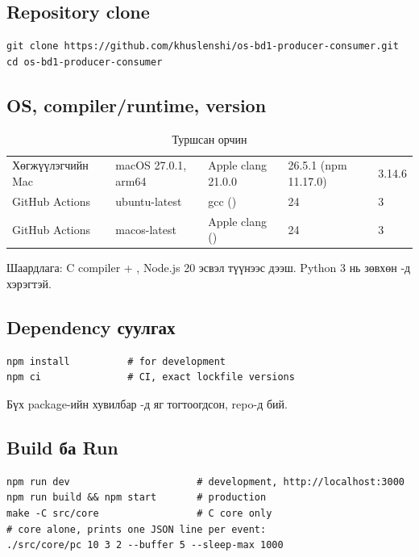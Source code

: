 \documentclass[12pt,a4paper]{article}
\begin{document}
\subsection{Repository clone}
\begin{lstlisting}[style=shell]
git clone https://github.com/khuslenshi/os-bd1-producer-consumer.git
cd os-bd1-producer-consumer
\end{lstlisting}

\subsection{OS, compiler/runtime, version}
\begin{table}[H]\centering\small
\caption{Туршсан орчин}\label{tab:env}
\begin{tabular}{|L{0.22\textwidth}|L{0.2\textwidth}|L{0.22\textwidth}|L{0.2\textwidth}|L{0.16\textwidth}|}\hline
{} &  &  &  &  \\\hline
Хөгжүүлэгчийн Mac & macOS 27.0.1, arm64 & Apple clang 21.0.0 & 26.5.1 (npm 11.17.0) & 3.14.6 \\\hline
GitHub Actions & ubuntu-latest & gcc () & 24 & 3 \\\hline
GitHub Actions & macos-latest & Apple clang () & 24 & 3 \\\hline
\end{tabular}
\end{table}
Шаардлага: C compiler + , Node.js 20 эсвэл түүнээс дээш. Python 3 нь зөвхөн -д хэрэгтэй.

\subsection{Dependency суулгах}
\begin{lstlisting}[style=shell]
npm install          # for development
npm ci               # CI, exact lockfile versions
\end{lstlisting}
Бүх package-ийн хувилбар -д яг тогтоогдсон,  repo-д бий.

\subsection{Build ба Run}
\begin{lstlisting}[style=shell]
npm run dev                      # development, http://localhost:3000
npm run build && npm start       # production
make -C src/core                 # C core only
# core alone, prints one JSON line per event:
./src/core/pc 10 3 2 --buffer 5 --sleep-max 1000
\end{lstlisting}
\end{document}
